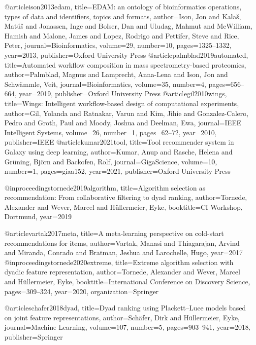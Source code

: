 @article{ison2013edam,
  title={EDAM: an ontology of bioinformatics operations, types of data and identifiers, topics and formats},
  author={Ison, Jon and Kala{\v{s}}, Mat{\'u}{\v{s}} and Jonassen, Inge and Bolser, Dan and Uludag, Mahmut and McWilliam, Hamish and Malone, James and Lopez, Rodrigo and Pettifer, Steve and Rice, Peter},
  journal={Bioinformatics},
  volume={29},
  number={10},
  pages={1325--1332},
  year={2013},
  publisher={Oxford University Press}
}
@article{palmblad2019automated,
  title={Automated workflow composition in mass spectrometry-based proteomics},
  author={Palmblad, Magnus and Lamprecht, Anna-Lena and Ison, Jon and Schw{\"a}mmle, Veit},
  journal={Bioinformatics},
  volume={35},
  number={4},
  pages={656--664},
  year={2019},
  publisher={Oxford University Press}
}
@article{gil2010wings,
  title={Wings: Intelligent workflow-based design of computational experiments},
  author={Gil, Yolanda and Ratnakar, Varun and Kim, Jihie and Gonzalez-Calero, Pedro and Groth, Paul and Moody, Joshua and Deelman, Ewa},
  journal={IEEE Intelligent Systems},
  volume={26},
  number={1},
  pages={62--72},
  year={2010},
  publisher={IEEE}
}
@article{kumar2021tool,
  title={Tool recommender system in {G}alaxy using deep learning},
  author={Kumar, Anup and Rasche, Helena and Gr{\"u}ning, Bj{\"o}rn and Backofen, Rolf},
  journal={GigaScience},
  volume={10},
  number={1},
  pages={giaa152},
  year={2021},
  publisher={Oxford University Press}
}

@inproceedings{tornede2019algorithm,
  title={Algorithm selection as recommendation: From collaborative filtering to dyad ranking},
  author={Tornede, Alexander and Wever, Marcel and H{\"u}llermeier, Eyke},
  booktitle={CI Workshop, Dortmund},
  year={2019}
}

@article{vartak2017meta,
  title={A meta-learning perspective on cold-start recommendations for items},
  author={Vartak, Manasi and Thiagarajan, Arvind and Miranda, Conrado and Bratman, Jeshua and Larochelle, Hugo},
  year={2017}
}
@inproceedings{tornede2020extreme,
  title={Extreme algorithm selection with dyadic feature representation},
  author={Tornede, Alexander and Wever, Marcel and H{\"u}llermeier, Eyke},
  booktitle={International Conference on Discovery Science},
  pages={309--324},
  year={2020},
  organization={Springer}
}


@article{schafer2018dyad,
  title={Dyad ranking using Plackett--Luce models based on joint feature representations},
  author={Sch{\"a}fer, Dirk and H{\"u}llermeier, Eyke},
  journal={Machine Learning},
  volume={107},
  number={5},
  pages={903--941},
  year={2018},
  publisher={Springer}
}




